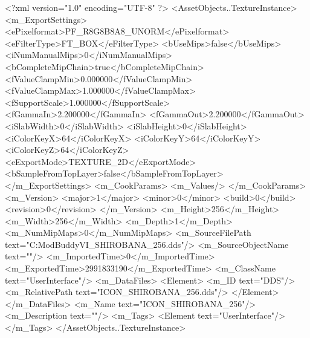 <?xml version="1.0" encoding="UTF-8" ?>
<AssetObjects..TextureInstance>
	<m_ExportSettings>
		<ePixelformat>PF_R8G8B8A8_UNORM</ePixelformat>
		<eFilterType>FT_BOX</eFilterType>
		<bUseMips>false</bUseMips>
		<iNumManualMips>0</iNumManualMips>
		<bCompleteMipChain>true</bCompleteMipChain>
		<fValueClampMin>0.000000</fValueClampMin>
		<fValueClampMax>1.000000</fValueClampMax>
		<fSupportScale>1.000000</fSupportScale>
		<fGammaIn>2.200000</fGammaIn>
		<fGammaOut>2.200000</fGammaOut>
		<iSlabWidth>0</iSlabWidth>
		<iSlabHeight>0</iSlabHeight>
		<iColorKeyX>64</iColorKeyX>
		<iColorKeyY>64</iColorKeyY>
		<iColorKeyZ>64</iColorKeyZ>
		<eExportMode>TEXTURE_2D</eExportMode>
		<bSampleFromTopLayer>false</bSampleFromTopLayer>
	</m_ExportSettings>
	<m_CookParams>
		<m_Values/>
	</m_CookParams>
	<m_Version>
		<major>1</major>
		<minor>0</minor>
		<build>0</build>
		<revision>0</revision>
	</m_Version>
	<m_Height>256</m_Height>
	<m_Width>256</m_Width>
	<m_Depth>1</m_Depth>
	<m_NumMipMaps>0</m_NumMipMaps>
	<m_SourceFilePath text="C:\Users\asus\Documents\Firaxis ModBuddy\Civilization VI\temppic\ICON_SHIROBANA_256.dds"/>
	<m_SourceObjectName text=""/>
	<m_ImportedTime>0</m_ImportedTime>
	<m_ExportedTime>2991833190</m_ExportedTime>
	<m_ClassName text="UserInterface"/>
	<m_DataFiles>
		<Element>
			<m_ID text="DDS"/>
			<m_RelativePath text="ICON_SHIROBANA_256.dds"/>
		</Element>
	</m_DataFiles>
	<m_Name text="ICON_SHIROBANA_256"/>
	<m_Description text=""/>
	<m_Tags>
		<Element text="UserInterface"/>
	</m_Tags>
</AssetObjects..TextureInstance>

